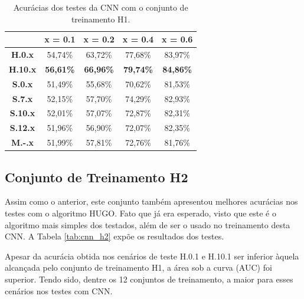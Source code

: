\begin{table}[!htb]
\centering
\begin{tabular}{c|c|c|c|c|}
\cline{2-5}
\textbf{}                             & \textbf{x = 0.1} & \textbf{x = 0.2} & \textbf{x = 0.4} & \textbf{x = 0.6} \\ \hline
\multicolumn{1}{|c|}{\textbf{H.0.x}}  & 54,74\%          & 63,72\%          & 77,68\%          & 83,97\%          \\ \hline
\multicolumn{1}{|c|}{\textbf{H.10.x}} & \textbf{56,61\%} & \textbf{66,96\%} & \textbf{79,74\%} & \textbf{84,86\%} \\ \hline
\multicolumn{1}{|c|}{\textbf{S.0.x}}  & 51,49\%          & 55,68\%          & 70,62\%          & 81,53\%          \\ \hline
\multicolumn{1}{|c|}{\textbf{S.7.x}}  & 52,15\%          & 57,70\%          & 74,29\%          & 82,93\%          \\ \hline
\multicolumn{1}{|c|}{\textbf{S.10.x}} & 52,01\%          & 57,07\%          & 72,87\%          & 82,31\%          \\ \hline
\multicolumn{1}{|c|}{\textbf{S.12.x}} & 51,96\%          & 56,90\%          & 72,07\%          & 82,35\%          \\ \hline
\multicolumn{1}{|c|}{\textbf{M.-.x}}  & 51,99\%          & 57,81\%          & 72,76\%          & 81,76\%          \\ \hline
\end{tabular}
\caption{Acurácias dos testes da CNN com o conjunto de treinamento H1.}
\label{tab:cnn_h1}
\end{table}


\subsection{Conjunto de Treinamento H2}

Assim como o anterior, este conjunto também apresentou melhores acurácias nos testes com o algoritmo HUGO. Fato que já era esperado, visto que este é o algoritmo mais simples dos testados, além de ser o usado no treinamento desta CNN. A Tabela \ref{tab:cnn_h2} expõe os resultados dos testes.

Apesar da acurácia obtida nos cenários de teste H.0.1 e H.10.1 ser inferior àquela alcançada pelo conjunto de treinamento H1, a área sob a curva (AUC) foi superior. Tendo sido, dentre os 12 conjuntos de treinamento, a maior para esses cenários nos testes com CNN.



